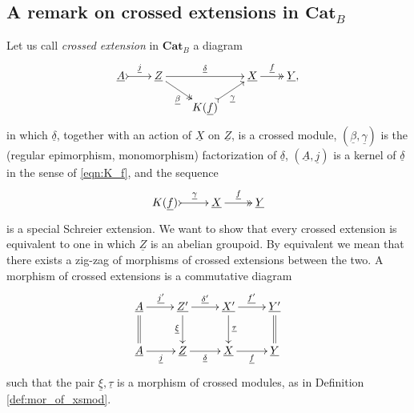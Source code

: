 \documentclass[11pt]{amsart}
\theoremstyle{plain}
\theoremstyle{definition}
\theoremstyle{remark}
\newcommand{\un}{\underline}
\begin{document}
\subsection{A remark on crossed extensions in $\mathbf{Cat}_B$}
Let us call \emph{crossed extension} in $\mathbf{Cat}_B$ a diagram
\begin{equation} \label{crossed extension}
\xymatrixrowsep{1pc}
\xymatrixcolsep{1.7pc}
\xymatrix{{\un{A}} \ar@{>->}[r]^{\un{j}} &{\un{Z}} \ar@{->>}[rd]_{\un{\beta}} \ar[rr]^-{\un{\delta}} &\ &{\un{X}} \ar@{->>}[r]^-{\un{f}} &{\un{Y},} \\
&\ &{K(\un{f})} \ar@{>->}[ru]_{\un{\gamma}} &\ &\
}
\end{equation}
in which $\un{\delta}$, together with an action of $\un{X}$ on $\un{Z}$, is a crossed module, $(\un{\beta}, \un{\gamma})$ is the (regular epimorphism, monomorphism) factorization of $\un{\delta}$, $(\un{A},\un{j})$ is a kernel of $\un{\delta}$ in the sense of \eqref{eqn:K_f}, and the sequence
\[ \xymatrix{ {K(\un{f})} \ar@{>->}[r]^-{\un{\gamma}} & {\un{X}} \ar@{->>}[r]^-{\un{f}} &{\un{Y}} } \]
is a special Schreier extension. We want to show that every crossed extension is equivalent to one in which ${\un{Z}}$ is an abelian groupoid. By equivalent we mean that there exists a zig-zag of morphisms of crossed extensions between the two. A morphism of crossed extensions is a commutative diagram
\[ \xymatrix{ \un{A} \ar@{=}[d] \ar[r]^{\un{j'}} &{\un{Z'}} \ar[d]_{\un{\xi}} \ar[r]^-{\un{\delta'}} & \un{X'} \ar[d]^{\un{\tau}} \ar[r]^{\un{f'}} & \un{Y'} \ar@{=}[d] \\
{\un{A}} \ar[r]_{\un{j}} &{\un{Z}} \ar[r]_-{\un{\delta}} &{\un{X}} \ar[r]_-{\un{f}} &{\un{Y}} } \]
such that the pair $\un{\xi}, \un{\tau}$ is a morphism of crossed modules, as in Definition \ref{def:mor_of_xsmod}.\\%
\end{document}

